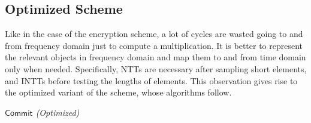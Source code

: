 \subsection{Optimized Scheme}

Like in the case of the encryption scheme, a lot of cycles are wasted going to and from frequency domain just to compute a multiplication. It is better to represent the relevant objects in frequency domain and map them to and from time domain only when needed. Specifically, NTTs are necessary after sampling short elements, and INTTs before testing the lengths of elements. This observation gives rise to the optimized variant of the scheme, whose algorithms follow.


\begin{algorithm}[!t] \label{algo:tb4-commit-optimized}
\begin{scriptsize}
\caption{\emph{$\mathsf{Commit}$ (Optimized)}}
\end{scriptsize}
\end{algorithm} 

